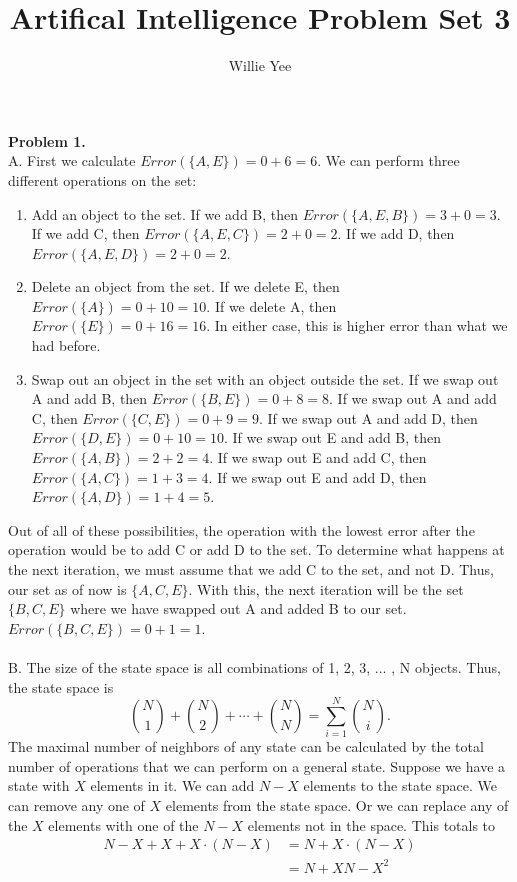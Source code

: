 \documentclass{article}
\begin{document}
\title{Artifical Intelligence Problem Set 3}
\date{}
\author{Willie Yee}
\maketitle
\noindent
\textbf{Problem 1.}\\
A. First we calculate $Error(\{A,E\}) = 0 + 6 = 6$. We can perform three different operations on the set:
\begin{enumerate}
	\item Add an object to the set. If we add B, then $Error(\{A,E,B\}) = 3 + 0 = 3$. If we add C, then $Error(\{A,E,C\}) = 2 + 0 = 2$. If we add D, then $Error(\{A,E,D\}) = 2 + 0 = 2$.
	\item Delete an object from the set. If we delete E, then $Error(\{A\}) = 0 + 10 = 10$. If we delete A, then $Error(\{E\}) = 0 + 16 = 16$. In either case, this is higher error than what we had before.
	\item Swap out an object in the set with an object outside the set. If we swap out A and add B, then $Error(\{B,E\}) = 0 + 8 = 8$. If we swap out A and add C, then $Error(\{C,E\}) = 0 + 9 = 9$. If we swap out A and add D, then $Error(\{D,E\}) = 0 + 10 = 10$. If we swap out E and add B, then $Error(\{A,B\}) = 2 + 2 = 4$. If we swap out E and add C, then $Error(\{A,C\}) = 1 + 3 = 4$. If we swap out E and add D, then $Error(\{A,D\}) = 1 + 4 = 5$.
\end{enumerate}
Out of all of these possibilities, the operation with the lowest error after the operation would be to add C or add D to the set. To determine what happens at the next iteration, we must assume that we add C to the set, and not D. Thus, our set as of now is $\{A,C,E\}$. With this, the next iteration will be the set $\{B,C,E\}$ where we have swapped out A and added B to our set. $Error(\{B,C,E\}) = 0 + 1 = 1$.\\
\\
B. The size of the state space is all combinations of 1, 2, 3, ... , N objects. Thus, the state space is $${N\choose 1}+{N\choose 2}+\cdots +{N\choose N}=\sum_{i=1}^{N} {N\choose i}.$$
The maximal number of neighbors of any state can be calculated by the total number of operations that we can perform on a general state. Suppose we have a state with $X$ elements in it. We can add $N-X$ elements to the state space. We can remove any one of $X$ elements from the state space. Or we can replace any of the $X$ elements with one of the $N-X$ elements not in the space. This totals to 
\begin{align*}
	N-X + X + X\cdot (N-X) &= N + X\cdot (N-X)\\
	&= N+XN-X^2
\end{align*}
\end{document}
